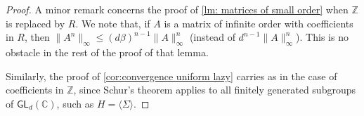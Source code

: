 \documentclass[10pt,a4paper]{amsart}
\def\C{\mathbb{C}}
\def\GL{\textsf{GL}}
\def\Z{\mathbb{Z}}
\begin{document}
\begin{proof}
A minor remark concerns the proof of \cref{lm: matrices of small order} when $\Z$ is replaced by $R$. We note that, if $A$ is a matrix of infinite order with coefficients in $R$, then $\|A^n\|_\infty \le (d\beta)^{n-1}\|A\|_\infty^n$ (instead of $d^{n-1}\|A\|_\infty^n$). This is no obstacle in the rest of the proof of that lemma.

Similarly, the proof of \cref{cor:convergence uniform lazy} carries as in the case of coefficients in $\Z$, since Schur's theorem applies to all finitely generated subgroups of $\GL_d(\C)$, such as $H = \langle\Sigma\rangle$.
%
\end{proof}
\end{document}
